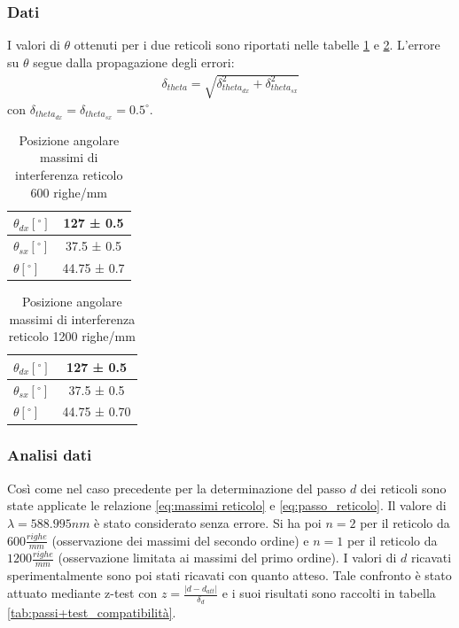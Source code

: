 \documentclass[a4paper]{article}
\begin{document}
\subsubsection{Dati}
I valori di $\theta$ ottenuti per i due reticoli sono riportati nelle tabelle \ref{tab:angoli_600} e \ref{tab:angoli_1200}. L'errore su $\theta$ segue dalla propagazione degli errori:
\begin{align}
\delta_{theta} = \sqrt{\delta_{theta_{dx}}^2+\delta_{theta_{sx}}^2}
\label{eq:err_angolo}
\end{align}
con $\delta_{theta_{dx}} =\delta_{theta_{sx}}= 0.5^\circ$.

\begin{table}[htbp]
\centering
\begin{tabular}{|l|c|}
\hline
$\theta_{dx} [^\circ]$ & 127 ± 0.5 \\\hline
$\theta_{sx} [^\circ]$ & 37.5 ± 0.5 \\\hline
$\theta [^\circ]$ & 44.75 ± 0.7  \\\hline
\end{tabular}
\caption{Posizione angolare massimi di interferenza reticolo 600 righe/mm}
\label{tab:angoli_600}
\end{table}

\begin{table}[htbp]
\centering
\begin{tabular}{|l|c|}
\hline
$\theta_{dx} [^\circ]$ & 127 ± 0.5 \\\hline
$\theta_{sx} [^\circ]$ & 37.5 ± 0.5 \\\hline
$\theta [^\circ]$ & 44.75 ± 0.70  \\\hline
\end{tabular}
\caption{Posizione angolare massimi di interferenza reticolo 1200 righe/mm}
\label{tab:angoli_1200}
\end{table}

\subsubsection{Analisi dati}
Così come nel caso precedente per la determinazione del passo $d$ dei reticoli sono state applicate le relazione \ref{eq:massimi reticolo} e \ref{eq:passo_reticolo}. Il valore di $\lambda=588.995 nm$ è stato considerato senza errore. Si ha poi $n=2$ per il reticolo da $600 \frac{righe}{mm}$ (osservazione dei massimi del secondo ordine) e $n=1$ per il reticolo da $1200 \frac{righe}{mm}$ (osservazione limitata ai massimi del primo ordine). I valori di $d$ ricavati sperimentalmente sono poi stati ricavati con quanto atteso. Tale confronto è stato attuato mediante z-test con $z = \frac{|d-d_{att}|}{\delta_d}$ e i suoi risultati sono raccolti in tabella \ref{tab:passi+test_compatibilità}.
\end{document}

